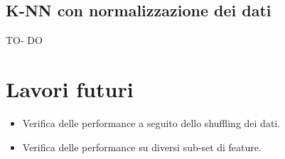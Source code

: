 \documentclass[fleqn,10pt]{SelfArx} %
\begin{document}
\subsection{K-NN con normalizzazione dei dati}
TO- DO
\section{Lavori futuri}
\begin{itemize}
\item Verifica delle performance a seguito dello shuffling dei dati.
\item Verifica delle performance su diversi sub-set di feature.

\end{itemize}







\end{document}

